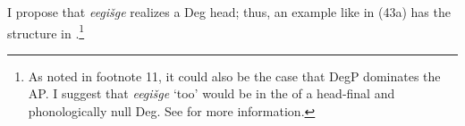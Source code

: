 \documentclass[output=paper]{LSP/langsci}
\begin{document}
\begin{exe}
\ex\label{ex:rosen:43}
\begin{xlist}




\end{xlist}
\end{exe}

I propose that \textit{eegišge} realizes a Deg head; thus, an example like in (43a) has the structure in .\footnote{As noted in footnote 11, it could also be the case that DegP dominates the AP. I suggest that \textit{eegišge} `too' would be in the  of a head-final and phonologically null Deg. See \citet{Rosen2015} for more information.}

\begin{exe}
\ex \label{ex:rosen:44}
{\hspace{1em}}\newline
{}
\end{exe}
\end{document}

